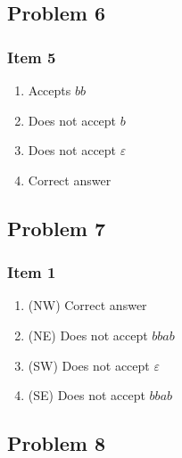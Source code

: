 \documentclass[docid=2012]{tcom_test1}
\begin{document}
\subsection{Problem 6}
\setcounter{subsubsection}{4}
\subsubsection{Item 5}
\begin{enumerate}[label=(\alph*)]
	\item Accepts $bb$
	\item Does not accept $b$
	\item Does not accept $\varepsilon$
	\item \label{itm:6_5_correct} Correct answer
\end{enumerate}
\subsection{Problem 7}
\subsubsection{Item 1}
\begin{enumerate}[label=(\alph*)]
	\item \label{itm:7_1_correct} (NW) Correct answer
	\item (NE) Does not accept $bbab$
	\item (SW) Does not accept $\varepsilon$
	\item (SE) Does not accept $bbab$
\end{enumerate}
\subsection{Problem 8}
\end{document}
